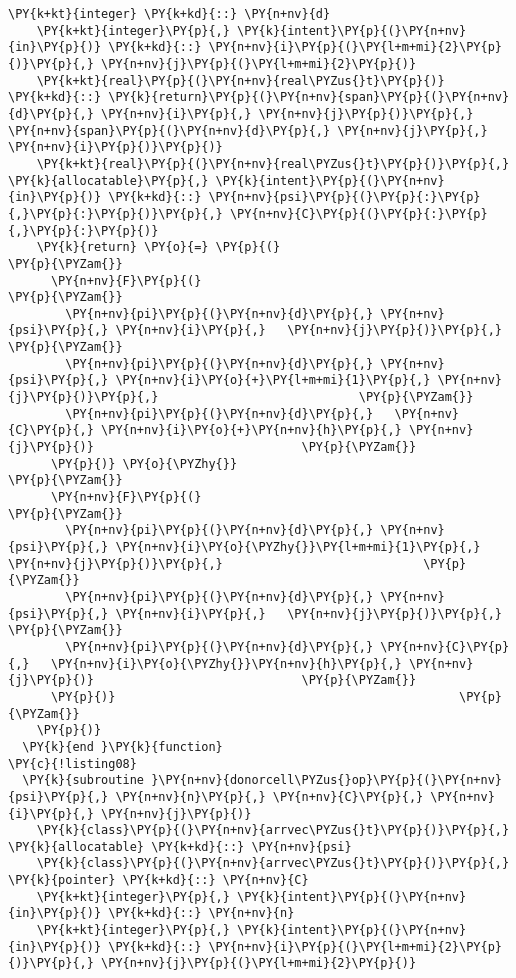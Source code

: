 \begin{Verbatim}[commandchars=\\\{\}]
    \PY{k+kt}{integer} \PY{k+kd}{::} \PY{n+nv}{d}
    \PY{k+kt}{integer}\PY{p}{,} \PY{k}{intent}\PY{p}{(}\PY{n+nv}{in}\PY{p}{)} \PY{k+kd}{::} \PY{n+nv}{i}\PY{p}{(}\PY{l+m+mi}{2}\PY{p}{)}\PY{p}{,} \PY{n+nv}{j}\PY{p}{(}\PY{l+m+mi}{2}\PY{p}{)} 
    \PY{k+kt}{real}\PY{p}{(}\PY{n+nv}{real\PYZus{}t}\PY{p}{)} \PY{k+kd}{::} \PY{k}{return}\PY{p}{(}\PY{n+nv}{span}\PY{p}{(}\PY{n+nv}{d}\PY{p}{,} \PY{n+nv}{i}\PY{p}{,} \PY{n+nv}{j}\PY{p}{)}\PY{p}{,} \PY{n+nv}{span}\PY{p}{(}\PY{n+nv}{d}\PY{p}{,} \PY{n+nv}{j}\PY{p}{,} \PY{n+nv}{i}\PY{p}{)}\PY{p}{)}
    \PY{k+kt}{real}\PY{p}{(}\PY{n+nv}{real\PYZus{}t}\PY{p}{)}\PY{p}{,} \PY{k}{allocatable}\PY{p}{,} \PY{k}{intent}\PY{p}{(}\PY{n+nv}{in}\PY{p}{)} \PY{k+kd}{::} \PY{n+nv}{psi}\PY{p}{(}\PY{p}{:}\PY{p}{,}\PY{p}{:}\PY{p}{)}\PY{p}{,} \PY{n+nv}{C}\PY{p}{(}\PY{p}{:}\PY{p}{,}\PY{p}{:}\PY{p}{)}           
    \PY{k}{return} \PY{o}{=} \PY{p}{(}                                         \PY{p}{\PYZam{}}
      \PY{n+nv}{F}\PY{p}{(}                                               \PY{p}{\PYZam{}}
        \PY{n+nv}{pi}\PY{p}{(}\PY{n+nv}{d}\PY{p}{,} \PY{n+nv}{psi}\PY{p}{,} \PY{n+nv}{i}\PY{p}{,}   \PY{n+nv}{j}\PY{p}{)}\PY{p}{,}                            \PY{p}{\PYZam{}}
        \PY{n+nv}{pi}\PY{p}{(}\PY{n+nv}{d}\PY{p}{,} \PY{n+nv}{psi}\PY{p}{,} \PY{n+nv}{i}\PY{o}{+}\PY{l+m+mi}{1}\PY{p}{,} \PY{n+nv}{j}\PY{p}{)}\PY{p}{,}                            \PY{p}{\PYZam{}}
        \PY{n+nv}{pi}\PY{p}{(}\PY{n+nv}{d}\PY{p}{,}   \PY{n+nv}{C}\PY{p}{,} \PY{n+nv}{i}\PY{o}{+}\PY{n+nv}{h}\PY{p}{,} \PY{n+nv}{j}\PY{p}{)}                             \PY{p}{\PYZam{}}
      \PY{p}{)} \PY{o}{\PYZhy{}}                                              \PY{p}{\PYZam{}}
      \PY{n+nv}{F}\PY{p}{(}                                               \PY{p}{\PYZam{}}
        \PY{n+nv}{pi}\PY{p}{(}\PY{n+nv}{d}\PY{p}{,} \PY{n+nv}{psi}\PY{p}{,} \PY{n+nv}{i}\PY{o}{\PYZhy{}}\PY{l+m+mi}{1}\PY{p}{,} \PY{n+nv}{j}\PY{p}{)}\PY{p}{,}                            \PY{p}{\PYZam{}}
        \PY{n+nv}{pi}\PY{p}{(}\PY{n+nv}{d}\PY{p}{,} \PY{n+nv}{psi}\PY{p}{,} \PY{n+nv}{i}\PY{p}{,}   \PY{n+nv}{j}\PY{p}{)}\PY{p}{,}                            \PY{p}{\PYZam{}}
        \PY{n+nv}{pi}\PY{p}{(}\PY{n+nv}{d}\PY{p}{,} \PY{n+nv}{C}\PY{p}{,}   \PY{n+nv}{i}\PY{o}{\PYZhy{}}\PY{n+nv}{h}\PY{p}{,} \PY{n+nv}{j}\PY{p}{)}                             \PY{p}{\PYZam{}}
      \PY{p}{)}                                                \PY{p}{\PYZam{}}
    \PY{p}{)}
  \PY{k}{end }\PY{k}{function}
\PY{c}{!listing08}
  \PY{k}{subroutine }\PY{n+nv}{donorcell\PYZus{}op}\PY{p}{(}\PY{n+nv}{psi}\PY{p}{,} \PY{n+nv}{n}\PY{p}{,} \PY{n+nv}{C}\PY{p}{,} \PY{n+nv}{i}\PY{p}{,} \PY{n+nv}{j}\PY{p}{)}  
    \PY{k}{class}\PY{p}{(}\PY{n+nv}{arrvec\PYZus{}t}\PY{p}{)}\PY{p}{,} \PY{k}{allocatable} \PY{k+kd}{::} \PY{n+nv}{psi}
    \PY{k}{class}\PY{p}{(}\PY{n+nv}{arrvec\PYZus{}t}\PY{p}{)}\PY{p}{,} \PY{k}{pointer} \PY{k+kd}{::} \PY{n+nv}{C}
    \PY{k+kt}{integer}\PY{p}{,} \PY{k}{intent}\PY{p}{(}\PY{n+nv}{in}\PY{p}{)} \PY{k+kd}{::} \PY{n+nv}{n}
    \PY{k+kt}{integer}\PY{p}{,} \PY{k}{intent}\PY{p}{(}\PY{n+nv}{in}\PY{p}{)} \PY{k+kd}{::} \PY{n+nv}{i}\PY{p}{(}\PY{l+m+mi}{2}\PY{p}{)}\PY{p}{,} \PY{n+nv}{j}\PY{p}{(}\PY{l+m+mi}{2}\PY{p}{)} 
    

\end{Verbatim}
